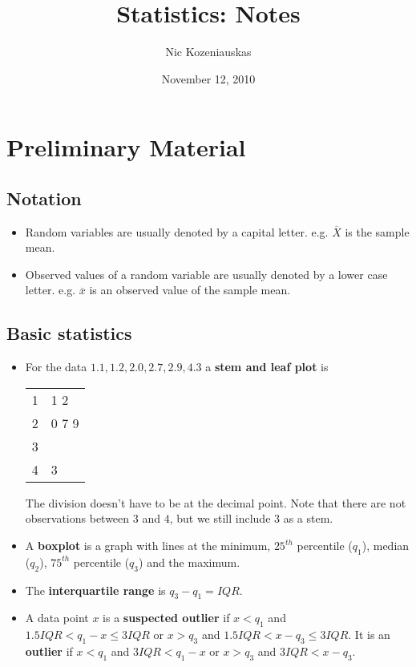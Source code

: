 \documentclass[10pt, two column]{article}
\title{Statistics: Notes}
\author{Nic Kozeniauskas}
\date{November 12, 2010}                                           %
\begin{document}
\maketitle

\tableofcontents

\section{Preliminary Material}

\subsection{Notation} 
\begin{itemize}
\item Random variables are usually denoted by a capital letter. e.g. $\overline{X}$ is the sample mean.
\item Observed values of a random variable are usually denoted by a lower case letter. e.g. $\overline{x}$ is an observed value of the sample mean.
\end{itemize}

\subsection{Basic statistics}

\begin{itemize}
\item For the data $1.1, 1.2, 2.0, 2.7, 2.9, 4.3$ a {\bf stem and leaf plot} is \\ \begin{center} \vspace{-12pt}
\begin{tabular}{r | l}
1 & 1 2 \\
2 & 0 7 9 \\
3\\
4 & 3
\end{tabular}
\end{center}
The division doesn't have to be at the decimal point. Note that there are not observations between $3$ and $4$, but we still include $3$ as a stem. 
\item A {\bf boxplot} is a graph with lines at the minimum, $25^{th}$ percentile ($q_{1}$), median ($q_{2}$), $75^{th}$ percentile ($q_{3}$) and the maximum. 
\item The {\bf interquartile range} is $q_{3} - q_{1} = IQR$. 
\item A data point $x$ is a {\bf suspected outlier} if $x < q_{1}$ and $1.5IQR < q_{1} - x \leq 3IQR$ or $x > q_{3}$ and $1.5IQR < x - q_{3} \leq 3IQR$. It is an {\bf outlier} if $x < q_{1}$ and $3IQR < q_{1} - x $ or $x > q_{3}$ and $3IQR < x - q_{3}$.
\end{itemize}
\end{document}
